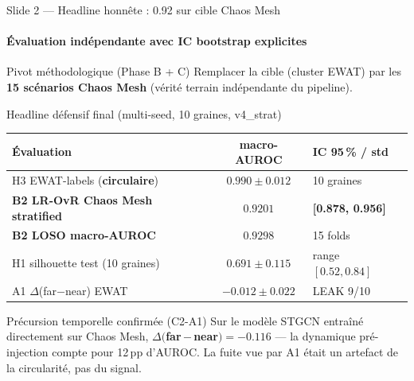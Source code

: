 \documentclass[10pt,aspectratio=169]{beamer}
\begin{document}
\begin{frame}{Slide 2 --- Headline honnête : 0.92 sur cible Chaos Mesh}
  \framesubtitle{Évaluation indépendante avec IC bootstrap explicites}

  \begin{block}{Pivot méthodologique (Phase B + C)}
    Remplacer la cible (cluster EWAT) par les \textbf{15 scénarios Chaos Mesh}
    (vérité terrain indépendante du pipeline).
  \end{block}

  \begin{block}{Headline défensif final (multi-seed, 10 graines, v4\_strat)}
    \centering
    \begin{tabular}{lcl}
      \toprule
      \textbf{Évaluation} & \textbf{macro-AUROC} & \textbf{IC 95\,\% / std} \\
      \midrule
      H3 EWAT-labels (\textbf{circulaire})    & $0.990 \pm 0.012$ & 10 graines \\
      \rowcolor{black!8}
      \textbf{B2 LR-OvR Chaos Mesh stratified} & $\mathbf{0.9201}$ & \textbf{[0.878, 0.956]} \\
      \rowcolor{black!8}
      \textbf{B2 LOSO macro-AUROC}             & $\mathbf{0.9298}$ & 15 folds \\
      H1 silhouette test (10 graines)          & $0.691 \pm 0.115$ & range $[0.52, 0.84]$ \\
      A1 $\Delta$(far$-$near) EWAT             & $-0.012 \pm 0.022$ & LEAK 9/10 \\
      \bottomrule
    \end{tabular}
  \end{block}

  \begin{block}{Précursion temporelle confirmée (C2-A1)}
    Sur le modèle STGCN entraîné directement sur Chaos Mesh, \textbf{$\Delta($far\,$-$\,near$) = -0.116$}
    --- la dynamique pré-injection compte pour 12\,pp d'AUROC. La fuite vue par A1
    était un artefact de la circularité, pas du signal.
  \end{block}
\end{frame}
\end{document}
